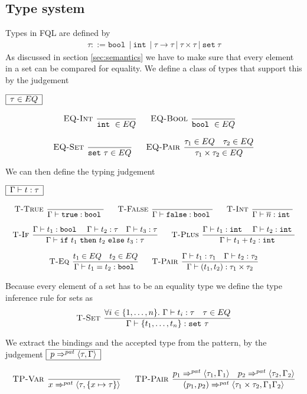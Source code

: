 \documentclass[a4paper]{article}
\newcommand{\pipe}{\ | \ }
\newcommand{\s}[1]{\mathtt{#1}}
\newcommand{\sn}{\overline{n}}
\newcommand{\sLb}{\s{\{}}
\newcommand{\sRb}{\s{\}}}
\newcommand{\sbool}{\s{bool\ }}
\newcommand{\sint}{\s{int\ }}
\newcommand{\sseta}{\s{set\ }}
\newcommand{\sif}{\s{if\ }}
\newcommand{\sthen}{\s{\ then\ }}
\newcommand{\selse}{\s{\ else\ }}
\newcommand{\strue}{\s{true}}
\newcommand{\sfalse}{\s{false}}
\newcommand{\sset}[1]{\sLb #1 \sRb}
\newcommand{\patbind}{\Rightarrow^{pat}}
\newcommand{\dotset}[2]{\{#1,\ldots,#2\}}
\newcommand{\angled}[1]{\langle #1\rangle}
\renewcommand{\rule}[3][]{\ \mbox{\textsc{#1 }}\dfrac{#2}{#3}\ }
\newcommand{\smbox}[1]{
  $\begin{array}{|c|}
    \hline
    #1 \\
    \hline
  \end{array}$
}
\begin{document}
\subsection{Type system}
Types in FQL are defined by
\begin{eqnarray*}
\tau ::= \sbool \pipe \sint \pipe \tau \to \tau \pipe \tau \times \tau \pipe \sseta \tau
\end{eqnarray*}
As discussed in section \ref{sec:semantics} we have to make sure
that every element in a set can be compared for equality. We define
a class of types that support this by the judgement
\smbox{\tau \in EQ}
\[\begin{array}{c}
\rule[EQ-Int]{}{\sint \in EQ}\quad
\rule[EQ-Bool]{}{\sbool \in EQ}\quad\\\\
\rule[EQ-Set]{}{\sseta \tau \in EQ}\quad
\rule[EQ-Pair]{\tau_1 \in EQ \quad \tau_2 \in EQ}{\tau_1 \times \tau_2 \in EQ}
\end{array}\]

We can then define the typing judgement
\smbox{\Gamma \vdash t : \tau}
\[\begin{array}{c}
\rule[T-True]{}{\Gamma \vdash \strue : \sbool}\quad
\rule[T-False]{}{\Gamma \vdash \sfalse : \sbool}\quad
\rule[T-Int]{}{\Gamma \vdash \sn : \sint}
\\\\
\rule[T-If]{\Gamma\vdash t_1 : \sbool \quad \Gamma\vdash t_2 : \tau \quad \Gamma\vdash t_3 : \tau}{\Gamma\vdash \sif t_1 \sthen t_2 \selse t_3 : \tau}\quad
\rule[T-Plus]{\Gamma\vdash t_1 : \sint \quad \Gamma\vdash t_2 : \sint}{\Gamma\vdash t_1 + t_2 : \sint}\\\\
\rule[T-Eq]{t_1 \in EQ \quad t_2 \in EQ}{\Gamma\vdash t_1 = t_2 : \sbool}\quad
\rule[T-Pair]{\Gamma\vdash t_1 : \tau_1 \quad \Gamma \vdash t_2 : \tau_2}{\Gamma \vdash (t_1, t_2) : \tau_1 \times \tau_2}
\end{array}
\]

Because every element of a set has to be an equality type we define the type inference rule for sets as
\[
\rule[T-Set]{\forall i\in \dotset{1}{n}.\ \Gamma\vdash t_i : \tau \quad \tau \in EQ}{\Gamma\vdash\sset{t_1,\ldots,t_n} : \sseta \tau}
\]

We extract the bindings and the accepted type from the
pattern, by the judgement \smbox{p \patbind \angled{\tau,\Gamma}}
\[
\rule[TP-Var]{}{x \patbind \angled{\tau,\{x \mapsto \tau\}}}\quad
\rule[TP-Pair]{p_1 \patbind \angled{\tau_1,\Gamma_1}\quad p_2 \patbind \angled{\tau_2,\Gamma_2}}
{(p_1, p_2) \patbind \angled{\tau_1\times\tau_2,\Gamma_1\Gamma_2}}
\]
\end{document}
